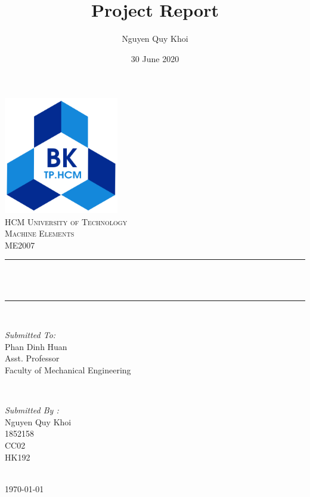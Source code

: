 \documentclass[12pt,a5paper,graybox,envcountchap,sectrefs]{svmono}
\title{Project Report}
\author{Nguyen Quy Khoi}
\date{30 June 2020}
\makeatletter
\let\thetitle\@title
\makeatother
\begin{document}
	\begin{titlepage}
		\centering
		\includegraphics[width=5cm]{logo.png}\\[1.0 cm]
		\textsc{\LARGE HCM University of Technology}\\[1cm]
		\textsc{\Large Machine Elements}\\[0.5cm] %
		\textsc{\Large ME2007}\\[0.5 cm]
		\rule{\linewidth}{0.2 mm} \\[0.5 cm]
		{ \huge \bfseries \thetitle}\\
		\rule{\linewidth}{0.2 mm} \\[1.5 cm]
		
		\begin{minipage}{0.4\textwidth}
			\begin{flushleft} \large
				\emph{Submitted To:}\\
				Phan Dinh Huan\\
				Asst. Professor\\
				Faculty of Mechanical Engineering\\
			\end{flushleft}
		\end{minipage}~
		\begin{minipage}{0.4\textwidth}
			
			\begin{flushright} \large
				\emph{Submitted By :} \\
				Nguyen Quy Khoi\\
				1852158\\
				CC02\\
				HK192\\
			\end{flushright}
			
		\end{minipage}\\[1.5 cm]
		\mbox{}\vfill
		{\large \today}
	\end{titlepage}
	
\end{document}
